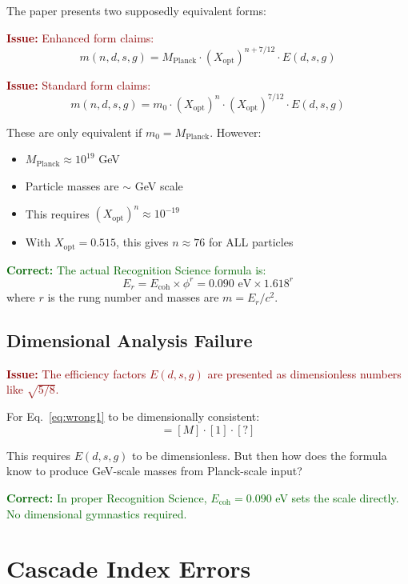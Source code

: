 \documentclass[12pt,a4paper]{article}
\newcommand{\issue}[1]{\textcolor{darkred}{\textbf{Issue: }#1}}
\newcommand{\correct}[1]{\textcolor{darkgreen}{\textbf{Correct: }#1}}
\begin{document}
The paper presents two supposedly equivalent forms:

\issue{Enhanced form claims:}
\begin{equation}
m(n,d,s,g) = M_{\text{Planck}} \cdot (X_{\text{opt}})^{n+7/12} \cdot E(d,s,g)
\label{eq:wrong1}
\end{equation}

\issue{Standard form claims:}
\begin{equation}
m(n,d,s,g) = m_0 \cdot (X_{\text{opt}})^n \cdot (X_{\text{opt}})^{7/12} \cdot E(d,s,g)
\label{eq:wrong2}
\end{equation}

These are only equivalent if $m_0 = M_{\text{Planck}}$. However:
\begin{itemize}
\item $M_{\text{Planck}} \approx 10^{19}$ GeV
\item Particle masses are $\sim$ GeV scale
\item This requires $(X_{\text{opt}})^n \approx 10^{-19}$
\item With $X_{\text{opt}} = 0.515$, this gives $n \approx 76$ for ALL particles
\end{itemize}

\correct{The actual Recognition Science formula is:}
\begin{equation}
E_r = E_{\text{coh}} \times \phi^r = 0.090 \text{ eV} \times 1.618^r
\end{equation}
where $r$ is the rung number and masses are $m = E_r/c^2$.

\subsection{Dimensional Analysis Failure}

\issue{The efficiency factors $E(d,s,g)$ are presented as dimensionless numbers like $\sqrt{5/8}$.}

For Eq.~\eqref{eq:wrong1} to be dimensionally consistent:
\begin{equation}
[M] = [M] \cdot [1] \cdot [?]
\end{equation}

This requires $E(d,s,g)$ to be dimensionless. But then how does the formula know to produce GeV-scale masses from Planck-scale input?

\correct{In proper Recognition Science, $E_{\text{coh}} = 0.090$ eV sets the scale directly. No dimensional gymnastics required.}

\section{Cascade Index Errors}
\end{document}

